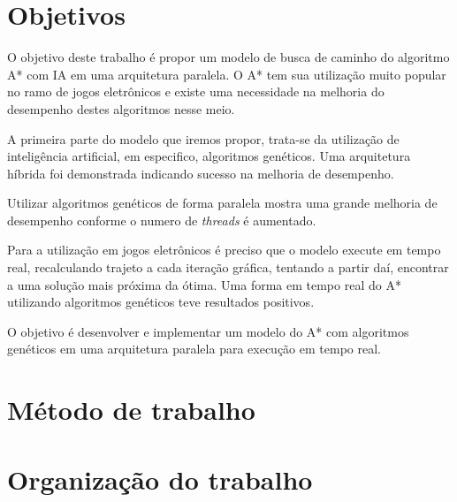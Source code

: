 \section{Objetivos}

O objetivo deste trabalho é propor um modelo de busca de caminho do algoritmo A* com IA em uma arquitetura paralela. O A* tem sua utilização muito popular no ramo de jogos eletrônicos e existe uma necessidade na melhoria do desempenho destes algoritmos nesse meio. \cite{Ross_Graham}

A primeira parte do modelo que iremos propor, trata-se da utilização de inteligência artificial, em especifico, algoritmos genéticos. Uma arquitetura híbrida foi demonstrada indicando sucesso na melhoria de desempenho. \cite{Ryan}

Utilizar algoritmos genéticos de forma paralela mostra uma grande melhoria de desempenho conforme o numero de \textit{threads} é aumentado. \cite{Reza}

Para a utilização em jogos eletrônicos é preciso que o modelo execute em tempo real, recalculando trajeto a cada iteração gráfica, tentando a partir daí, encontrar a uma solução mais próxima da ótima. Uma forma em tempo real do A* utilizando algoritmos genéticos teve resultados positivos. \cite{Ulysses2}

O objetivo é desenvolver e implementar um modelo do A* com algoritmos genéticos em uma arquitetura paralela para execução em tempo real. 

\section{Método de trabalho}


\section{Organização do trabalho}


